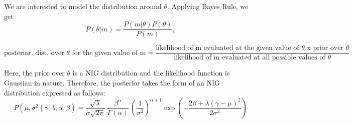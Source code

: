	
	We are interested to model the distribution around $\theta$. Applying Bayes Rule, we get
	\begin{equation}\label{eqn_bayes_der}
		P(\theta|m) = \frac{P(m|\theta)P(\theta)}{P(m)},
	\end{equation}
	
	\begin{equation*}{}
		\text{posterior. dist. over $\theta$ for the given value of m} = \frac{\text{likelihood of m evaluated at the given value of $\theta$ x prior over $\theta$}}{\text{likelihood of m evaluated at all possible values of $\theta$}}
	\end{equation*}
	
	Here, the prior over $\theta$ is a NIG distribution and the likelihood function is Gaussian in nature. Therefore, the posterior takes the form of an NIG distribution expressed as follows:
	\begin{equation}
		P(\mu,\sigma^2\mid\gamma,\lambda,\alpha,\beta) =  \frac {\sqrt{\lambda}} {\sigma\sqrt{2\pi} } \, \frac{\beta^\alpha}{\Gamma(\alpha)} \, \left( \frac{1}{\sigma^2} \right)^{\alpha + 1}   \exp \left( -\frac { 2\beta + \lambda(\gamma - \mu)^2} {2\sigma^2}  \right)
	\end{equation} 

